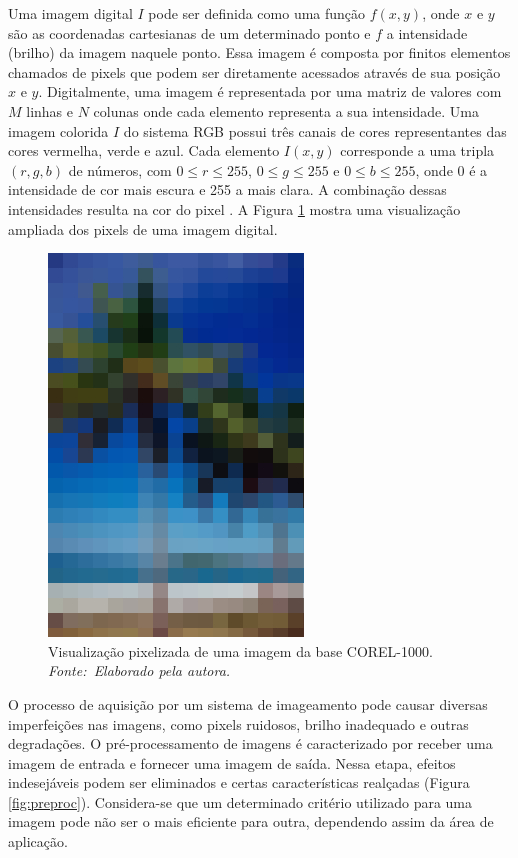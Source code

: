 Uma imagem digital $I$ pode ser definida como uma função $f(x,y)$, onde $x$ e $y$ são as coordenadas cartesianas de um determinado ponto e $f$ a intensidade (brilho) da imagem naquele ponto. Essa imagem é composta por finitos elementos chamados de pixels que podem ser diretamente acessados através de sua posição $x$ e $y$. Digitalmente, uma imagem é representada por uma matriz de valores com $M$ linhas e $N$ colunas onde cada elemento representa a sua intensidade. Uma imagem colorida $I$ do sistema RGB possui três canais de cores representantes das cores vermelha, verde e azul. Cada elemento $I(x,y)$ corresponde a uma tripla $(r, g, b)$ de números, com $0 \leq r \leq 255$, $0 \leq g \leq 255$ e $0 \leq b \leq 255$, onde 0 é a intensidade de cor mais escura e 255 a mais clara. A combinação dessas intensidades resulta na cor do pixel \cite{Gonzalez2007}. A Figura \ref{fig:pixel} mostra uma visualização ampliada dos pixels de uma imagem digital.

\begin{figure}[htbp]
 \begin{center}
   \includegraphics[width=0.4\linewidth]{figuras/pixel.jpg}
 \caption[Visualização pixelizada de uma imagem da base COREL-1000.]{Visualização pixelizada de uma imagem da base COREL-1000\footnotemark. \\ \textit{Fonte:~Elaborado pela autora.}}
 \label{fig:pixel}
 \end{center}
\end{figure}
O processo de aquisição por um sistema de imageamento pode causar diversas imperfeições nas imagens, como pixels ruidosos, brilho inadequado e outras degradações. O pré-processamento de imagens é caracterizado por receber uma imagem de entrada e fornecer uma imagem de saída. Nessa etapa, efeitos indesejáveis podem ser eliminados e certas características realçadas (Figura \ref{fig:preproc}). Considera-se que um determinado critério utilizado para uma imagem pode não ser o mais eficiente para outra, dependendo assim da área de aplicação.

